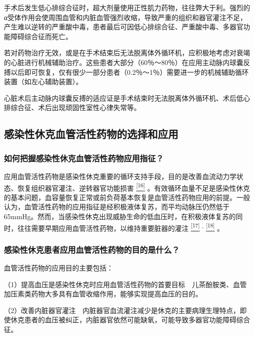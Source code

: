 手术后发生低心排综合征时，超大剂量使用正性肌力药物，往往弊大于利。强烈的α受体作用会使周围血管和内脏血管强烈收缩，导致严重的组织和器官灌注不足，产生难以逆转的严重酸中毒，患者最后可因低心排综合征、严重酸中毒、多器官功能障碍综合征而死亡。

若对药物治疗无效，或是在手术结束后无法脱离体外循环机，应积极地考虑对衰竭的心脏进行机械辅助治疗。这些患者大部分（60％～80％）在应用主动脉内球囊反搏以后即可恢复，仅有很少一部分患者（0.2％～1％）需要进一步的机械辅助循环装置（如左心辅助装置）。

心脏术后主动脉内球囊反搏的适应证是手术结束时无法脱离体外循环机、术后低心排综合征、术后出现顽固性室性心律失常等。

\subsection{感染性休克血管活性药物的选择和应用}

\subsubsection{如何把握感染性休克血管活性药物应用指征？}

应用血管活性药物是感染性休克重要的循环支持手段，目的是改善血流动力学状态、恢复组织器官灌注、逆转器官功能损害
\protect\hyperlink{text00008.htmlux5cux23ch16-7}{\textsuperscript{{[}16{]}}}
。有效循环血量不足是感染性休克的基本问题，血容量恢复正常或前负荷基本恢复是血管活性药物应用的前提。一般认为，血管活性药物的应用指征是经积极液体复苏，而平均动脉压仍然低于65mmHg。然而，当感染性休克出现威胁生命的低血压时，在积极液体复苏的同时，往往需要早期应用血管活性药物，以维持重要脏器的灌注
\protect\hyperlink{text00008.htmlux5cux23ch17-7}{\textsuperscript{{[}17{]}}}
\textsuperscript{,}
\protect\hyperlink{text00008.htmlux5cux23ch18-7}{\textsuperscript{{[}18{]}}}
。

\subsubsection{感染性休克患者应用血管活性药物的目的是什么？}

血管活性药物的应用目的主要包括：

（1）提高血压是感染性休克时应用血管活性药物的首要目标　儿茶酚胺类、血管加压素类药物大多具有血管收缩作用，能够实现提高血压的目的。

（2）改善内脏器官灌注　内脏器官血流灌注减少是休克的主要病理生理特点，即使休克患者的血压被纠正，内脏器官依然可能缺氧，可能导致多器官功能障碍综合征。

